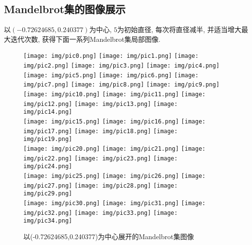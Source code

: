 \documentclass[UTF8]{ctexart}
\begin{document}
\subsection{Mandelbrot集的图像展示}

以$(-0.72624685,0.240377)$为中心, $5$为初始直径, 每次将直径减半, 并适当增大最大迭代次数, 获得下面一系列Mandelbrot集局部图像. 

\begin{figure}[H]
    \centering
    \texttt{[image: img/pic0.png]}
    \texttt{[image: img/pic1.png]}
    \texttt{[image: img/pic2.png]}
    \texttt{[image: img/pic3.png]}
    \texttt{[image: img/pic4.png]}
    \\
    \centering
    \vspace{2pt} \texttt{[image: img/pic5.png]}
    \texttt{[image: img/pic6.png]}
    \texttt{[image: img/pic7.png]}
    \texttt{[image: img/pic8.png]}
    \texttt{[image: img/pic9.png]}
    \\
    \centering
    \vspace{2pt} \texttt{[image: img/pic10.png]}
    \texttt{[image: img/pic11.png]}
    \texttt{[image: img/pic12.png]}
    \texttt{[image: img/pic13.png]}
    \texttt{[image: img/pic14.png]}
    \\
    \centering
    \vspace{2pt} \texttt{[image: img/pic15.png]}
    \texttt{[image: img/pic16.png]}
    \texttt{[image: img/pic17.png]}
    \texttt{[image: img/pic18.png]}
    \texttt{[image: img/pic19.png]}
    \\
    \centering
    \vspace{2pt} \texttt{[image: img/pic20.png]}
    \texttt{[image: img/pic21.png]}
    \texttt{[image: img/pic22.png]}
    \texttt{[image: img/pic23.png]}
    \texttt{[image: img/pic24.png]}
    \\
    \centering
    \vspace{2pt} \texttt{[image: img/pic25.png]}
    \texttt{[image: img/pic26.png]}
    \texttt{[image: img/pic27.png]}
    \texttt{[image: img/pic28.png]}
    \texttt{[image: img/pic29.png]}
    \\
    \centering
    \vspace{2pt} \texttt{[image: img/pic30.png]}
    \texttt{[image: img/pic31.png]}
    \texttt{[image: img/pic32.png]}
    \texttt{[image: img/pic33.png]}
    \texttt{[image: img/pic34.png]}
    \caption{以(-0.72624685,0.240377)为中心展开的Mandelbrot集图像}
\end{figure}
\end{document}
